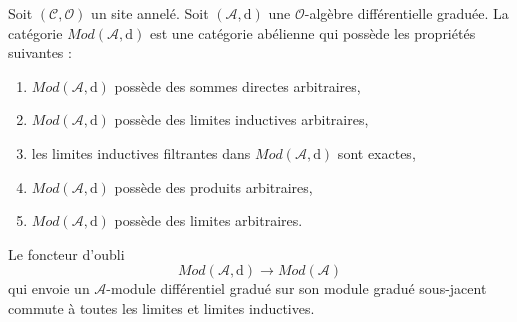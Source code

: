 \begin{lemma}
\label{lemma-dgm-abelian} Soit
$(\mathcal{C}, \mathcal{O})$ un site annelé. Soit
$(\mathcal{A}, \text{d})$ une $\mathcal{O}$-algèbre différentielle graduée. La catégorie
$\textit{Mod}(\mathcal{A}, \text{d})$ est une catégorie abélienne qui possède les
propriétés suivantes :
\begin{enumerate}
\item $\textit{Mod}(\mathcal{A}, \text{d})$ possède des sommes directes arbitraires,
\item $\textit{Mod}(\mathcal{A}, \text{d})$ possède des limites inductives arbitraires,
\item les limites inductives filtrantes dans $\textit{Mod}(\mathcal{A}, \text{d})$ sont exactes,
\item $\textit{Mod}(\mathcal{A}, \text{d})$ possède des produits
arbitraires, \item $\textit{Mod}(\mathcal{A}, \text{d})$ possède des limites
arbitraires. \end{enumerate}
Le foncteur
d'oubli $$
\textit{Mod}(\mathcal{A}, \text{d})
\longrightarrow
\textit{Mod}(\mathcal{A})
$$
qui envoie un $\mathcal{A}$-module différentiel gradué sur son module
gradué sous-jacent commute à toutes les limites et limites inductives.
\end{lemma}

